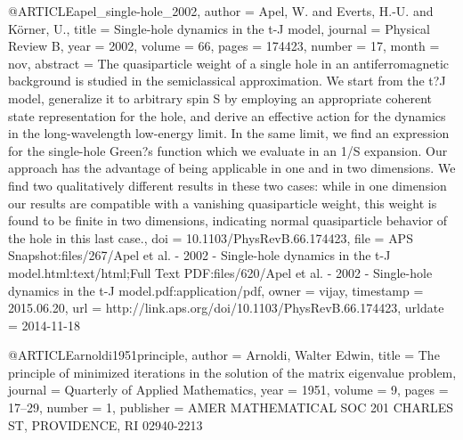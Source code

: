 @ARTICLE{apel_single-hole_2002,
  author = {Apel, W. and Everts, H.-U. and Körner, U.},
  title = {Single-hole dynamics in the t-{J} model},
  journal = {Physical Review B},
  year = {2002},
  volume = {66},
  pages = {174423},
  number = {17},
  month = nov,
  abstract = {The quasiparticle weight of a single hole in an antiferromagnetic
	background is studied in the semiclassical approximation. We start
	from the t?J model, generalize it to arbitrary spin S by employing
	an appropriate coherent state representation for the hole, and derive
	an effective action for the dynamics in the long-wavelength low-energy
	limit. In the same limit, we find an expression for the single-hole
	Green?s function which we evaluate in an 1/S expansion. Our approach
	has the advantage of being applicable in one and in two dimensions.
	We find two qualitatively different results in these two cases: while
	in one dimension our results are compatible with a vanishing quasiparticle
	weight, this weight is found to be finite in two dimensions, indicating
	normal quasiparticle behavior of the hole in this last case.},
  doi = {10.1103/PhysRevB.66.174423},
  file = {APS Snapshot:files/267/Apel et al. - 2002 - Single-hole dynamics in the t-J model.html:text/html;Full Text PDF:files/620/Apel et al. - 2002 - Single-hole dynamics in the t-J model.pdf:application/pdf},
  owner = {vijay},
  timestamp = {2015.06.20},
  url = {http://link.aps.org/doi/10.1103/PhysRevB.66.174423},
  urldate = {2014-11-18}
}

@ARTICLE{arnoldi1951principle,
  author = {Arnoldi, Walter Edwin},
  title = {The principle of minimized iterations in the solution of the matrix
	eigenvalue problem},
  journal = {Quarterly of Applied Mathematics},
  year = {1951},
  volume = {9},
  pages = {17--29},
  number = {1},
  publisher = {AMER MATHEMATICAL SOC 201 CHARLES ST, PROVIDENCE, RI 02940-2213}
}

